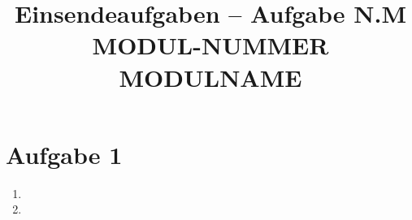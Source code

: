 \documentclass[a4paper,12pt]{article}
\title{Einsendeaufgaben -- Aufgabe N.M\\[0.5em]
\large MODUL-NUMMER MODULNAME}
\author{}
\date{}
\begin{document}
\maketitle

\section*{Aufgabe 1}

\begin{enumerate}[label=\alph*)]

    \item

    \item

\end{enumerate}
\end{document}
